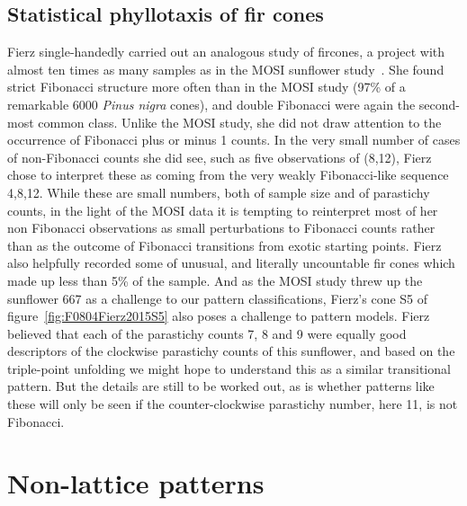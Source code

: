 \subsection{Statistical phyllotaxis of fir cones}

Fierz single-handedly carried out an analogous study of fircones, a  project with almost ten times as many samples as in the MOSI sunflower study~\autocite{fierzAberrantPhyllotacticPatterns2015}. She found strict Fibonacci structure more often than in the MOSI study (97\% of a remarkable 6000 \textit{Pinus nigra} cones), and double Fibonacci were again the second-most common class. Unlike the MOSI study, she did not draw attention to the occurrence of Fibonacci plus or minus 1 counts. In the very small number of cases of non-Fibonacci counts she did see, such as five  observations of (8,12),  Fierz chose to interpret these as coming from the very weakly Fibonacci-like sequence 4,8,12. While these are small numbers, both of sample size and of parastichy counts, in the light of the MOSI data  it is tempting to reinterpret most of her non Fibonacci observations as small perturbations to Fibonacci counts rather than as the outcome of Fibonacci transitions from exotic starting points. Fierz also helpfully recorded some of unusual, and literally uncountable fir cones which made up less than 5\% of the sample.  And as the MOSI study threw up the sunflower 667 as a challenge to our pattern classifications, 
Fierz's cone S5 of figure~\ref{fig:F0804Fierz2015S5} also poses a challenge to pattern models. Fierz believed that each of the parastichy counts 7, 8 and 9 were equally good descriptors of the clockwise parastichy counts of this sunflower, and based on the triple-point unfolding we might hope to understand this as a similar transitional pattern. But the details are still to be worked out, as is whether patterns like these will only be seen if the counter-clockwise parastichy number, here 11, is not Fibonacci.


\section{Non-lattice patterns}
